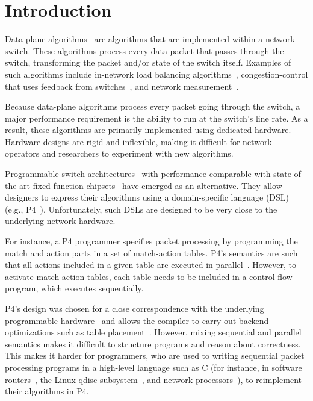 \section{Introduction}
\label{s:intro}

Data-plane algorithms~\cite{cestan} are algorithms that are implemented within
a network switch. These algorithms process every data packet that passes
through the switch, transforming the packet and/or state of the switch itself.
Examples of such algorithms include in-network load balancing
algorithms~\cite{conga, ecmp}, congestion-control that uses feedback from
switches~\cite{xcp, rcp, pdq, dctcp}, and network measurement~\cite{minsketch,
heavy_hitters}.

Because data-plane algorithms process every packet going through the switch, a
major performance requirement is the ability to run at the switch's line rate.
As a result, these algorithms are primarily implemented using dedicated
hardware. Hardware designs are rigid and inflexible, making it difficult for
network operators and researchers to experiment with new algorithms.

Programmable switch architectures~\cite{flexpipe, xpliant, rmt} with
performance comparable with state-of-the-art fixed-function
chipsets~\cite{tomahawk, mellanox} have emerged as an alternative. They allow
designers to express their algorithms using a domain-specific language (DSL)
(e.g., P4~\cite{p4}).  Unfortunately, such DSLs are designed to be very close
to the underlying network hardware.

For instance, a P4 programmer specifies packet processing by programming the
match and action parts in a set of match-action tables. P4's semantics are such
that all actions included in a given table are executed in
parallel~\cite{p4Spec}. However, to activate match-action tables, each table needs
to be included in a control-flow program, which executes sequentially.

P4's design was chosen for a close correspondence with the underlying
programmable hardware~\cite{flexpipe, rmt} and allows the compiler to carry out
backend optimizations such as table placement~\cite{lavanya_compiler}.
However, mixing sequential and parallel semantics makes it difficult to
structure programs and reason about correctness. This makes it harder for
programmers, who are used to writing sequential packet processing programs in a
high-level language such as C (for instance, in software routers~\cite{click},
the Linux qdisc subsystem~\cite{qdisc}, and network processors~\cite{npu}), to
reimplement their algorithms in P4.

